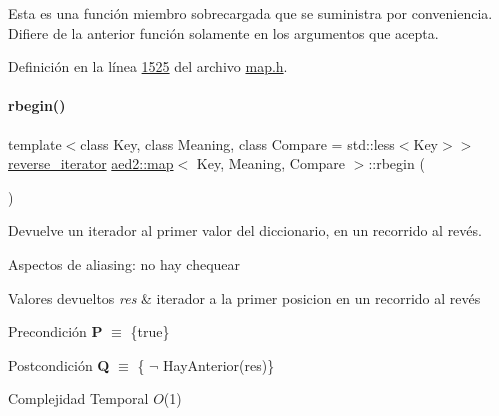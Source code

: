 Esta es una función miembro sobrecargada que se suministra por conveniencia. Difiere de la anterior función solamente en los argumentos que acepta. 

Definición en la línea \hyperlink{map_8h_source_l01525}{1525} del archivo \hyperlink{map_8h_source}{map.\+h}.

\mbox{\label{classaed2_1_1map_ac412d3902112122c1bffe2d4283a4e9d_ac412d3902112122c1bffe2d4283a4e9d}} 
\paragraph{\texorpdfstring{rbegin()}{rbegin()}\hspace{0.1cm}{\footnotesize\ttfamily [1/2]}}
{\footnotesize\ttfamily template$<$class Key, class Meaning, class Compare = std\+::less$<$\+Key$>$$>$ \\
\hyperlink{classaed2_1_1map_a8e6a592062260177fd73b2f9897b1dd5_a8e6a592062260177fd73b2f9897b1dd5}{reverse\+\_\+iterator} \hyperlink{classaed2_1_1map}{aed2\+::map}$<$ Key, Meaning, Compare $>$\+::rbegin (\begin{DoxyParamCaption}{ }\end{DoxyParamCaption})\hspace{0.3cm}{\ttfamily [inline]}}



Devuelve un iterador al primer valor del diccionario, en un recorrido al revés. 

\begin{DoxyParagraph}{Aspectos de aliasing\+:}
no hay chequear
\end{DoxyParagraph}

\begin{DoxyRetVals}{Valores devueltos}
{\em res} & iterador a la primer posicion en un recorrido al revés\\
\hline
\end{DoxyRetVals}
\begin{DoxyPrecond}{Precondición}
{\bfseries P} $\equiv$ \{true\} 
\end{DoxyPrecond}
\begin{DoxyPostcond}{Postcondición}
{\bfseries Q} $\equiv$ \{ $\lnot$ Hay\+Anterior(res)\}
\end{DoxyPostcond}

\begin{DoxyDescription}
\item[Complejidad Temporal]$O$(1)
\end{DoxyDescription}

